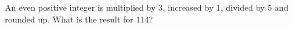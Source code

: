 An even positive integer is multiplied by $3$, increased by $1$, divided by $5$ and rounded up. What is the result for $114$?

